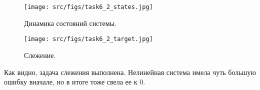 \begin{figure}[ht!]
        \centering
        \texttt{[image: src/figs/task6\_2\_states.jpg]}
        \caption{Динамика состояний системы.}
        \label{fig:task6_2_states}
\end{figure}

\begin{figure}[ht!]
        \centering
        \texttt{[image: src/figs/task6\_2\_target.jpg]}
        \caption{Слежение.}
        \label{fig:task6_2_z}
\end{figure}
Как видно, задача слежения выполнена. Нелинейная система имела чуть большую ошибку вначале, но в итоге тоже свела ее к 0.
\FloatBarrier